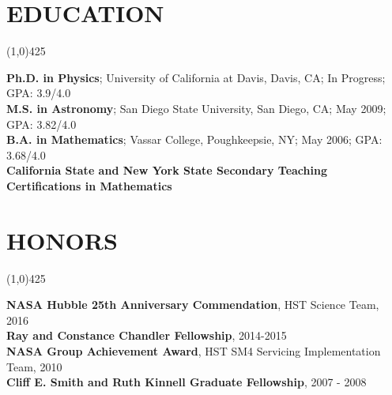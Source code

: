 \documentclass{res}
\begin{document}
\begin{resume}
\section{EDUCATION}
\vspace{-.2in} 
\begin{center}
\line(1,0){425}
\end{center}
\vspace{-.3in} 
\vspace{0.1in} 
   {\bf Ph.D. in Physics}; University of California at Davis, Davis, CA; In Progress; GPA: 3.9/4.0 \\
   {\bf M.S. in Astronomy}; San Diego State University, San Diego, CA; May 2009; GPA: 3.82/4.0 \\
   {\bf B.A. in Mathematics}; Vassar College, Poughkeepsie, NY; May 2006; GPA: 3.68/4.0 \\   
   {\bf California State and New York State Secondary Teaching Certifications in Mathematics} 
\section{HONORS}
\vspace{-.2in} 
\begin{center}
\line(1,0){425}
\end{center}
\vspace{-.3in} 
\vspace{0.1in} 
{\bf NASA Hubble 25th Anniversary Commendation}, HST Science Team, 2016 \\ %
{\bf Ray and Constance Chandler Fellowship}, 2014-2015 \\
{\bf NASA Group Achievement Award}, HST SM4 Servicing Implementation Team, 2010 \\
{\bf Cliff E. Smith and Ruth Kinnell Graduate Fellowship}, 2007 - 2008 
%    

\end{resume}
\end{document}
